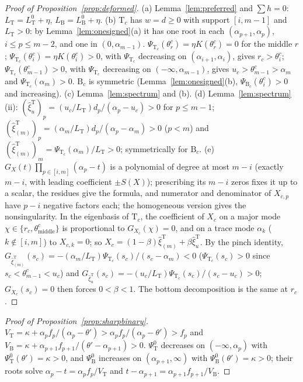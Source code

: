 \documentclass[11pt,a4paper]{report}
\newcommand{\Ts}{\mathrm T}
\newcommand{\Bs}{\mathrm B}
\begin{document}
\begin{proof}[Proof of Proposition~\ref{prop:deformed}]
(a) Lemma~\ref{lem:preferred} and \(\sum h=0\): \(L_\Ts=L^0_\Ts+\eta\), \(L_\Bs=L^0_\Bs+\eta\). (b) \(\Ts_c\) has \(w=d\ge0\) with support \([i,m-1]\)
and \(L_\Ts>0\): by Lemma~\ref{lem:onesigned}(a) it has one root in each \((\alpha_{p+1},\alpha_p)\), \(i\le p\le m-2\), and one in
\((0,\alpha_{m-1})\). \(\Psi_{\Ts_c}(\theta^c_r)=\eta K(\theta^c_r)=0\) for the middle \(r\); \(\Psi_{\Ts_c}(\theta^c_i)=\eta K(\theta^c_i)>0\), with
\(\Psi_{\Ts_c}\) decreasing on \((\alpha_{i+1},\alpha_i)\), gives \(r_c>\theta^c_i\); \(\Psi_{\Ts_c}(\theta^c_{m-1})>0\), with \(\Psi_{\Ts_c}\) decreasing on
\((-\infty,\alpha_{m-1})\), gives \(u_c>\theta^c_{m-1}>\alpha_m\) and \(\Psi_{\Ts_c}(\alpha_m)>0\). \(\Bs_c\) is symmetric (Lemma~\ref{lem:onesigned}(b),
\(\Psi_{\Bs_c}(\theta^c_i)>0\) and increasing). (c) Lemma~\ref{lem:spectrum} and (b). (d) Lemma~\ref{lem:spectrum}(ii):
\((\hat\xi^\Ts_u)_p=(u_c/L_\Ts)d_p/(\alpha_p-u_c)>0\) for \(p\le m-1\); \((\hat\xi^\Ts_{(m)})_p=(\alpha_m/L_\Ts)d_p/(\alpha_p-\alpha_m)>0\) (\(p<m\)) and
\((\hat\xi^\Ts_{(m)})_m=\Psi_{\Ts_c}(\alpha_m)/L_\Ts>0\); symmetrically for \(\Bs_c\). (e) \(G_X(t)\prod_{p\in[i,m]}(\alpha_p-t)\) is a polynomial of
degree at most \(m-i\) (exactly \(m-i\), with leading coefficient \(\pm S(X)\)); prescribing its \(m-i\) zeros fixes it up to a scalar,
the residues give the formula, and numerator and denominator of \(X_{c,p}\) have \(p-i\) negative factors each; the homogeneous
version gives the nonsingularity. In the eigenbasis of \(\Ts_c\), the coefficient of \(X_c\) on a major mode
\(\chi\in\{r_c,\theta^c_{\mathrm{middle}}\}\) is proportional to \(G_{X_c}(\chi)=0\), and on a trace mode \(\alpha_k\) (\(k\notin[i,m]\)) to
\(X_{c,k}=0\); so \(X_c=(1-\beta)\hat\xi^\Ts_{(m)}+\beta\hat\xi^\Ts_u\). By the pinch identity,
\(G_{\hat\xi^\Ts_{(m)}}(s_c)=-(\alpha_m/L_\Ts)\Psi_{\Ts_c}(s_c)/(s_c-\alpha_m)<0\) (\(\Psi_{\Ts_c}(s_c)>0\) since \(s_c<\theta^c_{m-1}<u_c\)) and
\(G_{\hat\xi^\Ts_u}(s_c)=-(u_c/L_\Ts)\Psi_{\Ts_c}(s_c)/(s_c-u_c)>0\); \(G_{X_c}(s_c)=0\) then forces \(0<\beta<1\). The bottom decomposition
is the same at \(r_c\).
\end{proof}

\begin{proof}[Proof of Proposition~\ref{prop:sharpbinary}]
\(V_\Ts=\kappa+\alpha_pf_p/(\alpha_p-\theta')>\alpha_pf_p/(\alpha_p-\theta')>f_p\) and \(V_\Bs=\kappa+\alpha_{p+1}f_{p+1}/(\theta'-\alpha_{p+1})>0\).
\(\Psi^0_\Ts\) decreases on \((-\infty,\alpha_p)\) with \(\Psi^0_\Ts(\theta')=\kappa>0\), and \(\Psi^0_\Bs\) increases on \((\alpha_{p+1},\infty)\) with
\(\Psi^0_\Bs(\theta')=\kappa>0\); their roots solve \(\alpha_p-t=\alpha_pf_p/V_\Ts\) and \(t-\alpha_{p+1}=\alpha_{p+1}f_{p+1}/V_\Bs\).
\end{proof}
\end{document}

